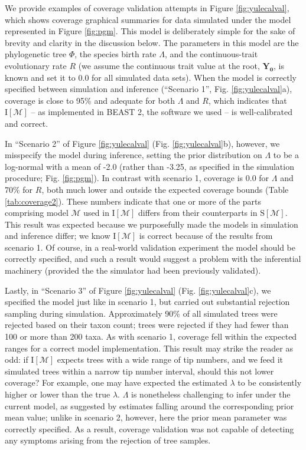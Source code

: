 \documentclass[oneside]{article}
\begin{document}
We provide examples of coverage validation attempts in Figure \ref{fig:yulecalval}, which shows coverage graphical summaries for data simulated under the model represented in Figure \ref{fig:pgm}.
This model is deliberately simple for the sake of brevity and clarity in the discussion below.
The parameters in this model are the phylogenetic tree $\Phi$, the species birth rate $\Lambda$, and the continuous-trait evolutionary rate $R$ (we assume the continuous trait value at the root, $\boldsymbol{Y_0}$, is known and set it to $\boldsymbol{0.0}$ for all simulated data sets).
When the model is correctly specified between simulation and inference (``Scenario 1'', Fig. \ref{fig:yulecalval}a), coverage is close to 95\% and adequate for both $\Lambda$ and $R$, which indicates that $\text{I}[\mathcal{M}]$ -- as implemented in BEAST 2, the software we used -- is well-calibrated and correct.

In ``Scenario 2'' of Figure \ref{fig:yulecalval} (Fig. \ref{fig:yulecalval}b), however, we misspecify the model during inference, setting the prior distribution on $\Lambda$ to be a log-normal with a mean of -2.0 (rather than -3.25, as specified in the simulation procedure; Fig. \ref{fig:pgm}).
In contrast with scenario 1, coverage is 0.0 for $\Lambda$ and 70\% for $R$, both much lower and outside the expected coverage bounds (Table \ref{tab:coverage2}).
These numbers indicate that one or more of the parts comprising model $\mathcal{M}$ used in $\text{I}[\mathcal{M}]$ differs from their counterparts in $\text{S}[\mathcal{M}]$.
This result was expected because we purposefully made the models in simulation and inference differ; we know $\text{I}[\mathcal{M}]$ is correct because of the results from scenario 1.
Of course, in a real-world validation experiment the model should be correctly specified, and such a result would suggest a problem with the inferential machinery (provided the the simulator had been previously validated).

Lastly, in ``Scenario 3'' of Figure \ref{fig:yulecalval} (Fig. \ref{fig:yulecalval}c), we specified the model just like in scenario 1, but carried out substantial rejection sampling during simulation.
Approximately 90\% of all simulated trees were rejected based on their taxon count; trees were rejected if they had fewer than 100 or more than 200 taxa.
As with scenario 1, coverage fell within the expected ranges for a correct model implementation.
This result may strike the reader as odd: if $\text{I}[\mathcal{M}]$ expects trees with a wide range of tip numbers, and we feed it simulated trees within a narrow tip number interval, should this not lower coverage?
For example, one may have expected the estimated $\lambda$ to be consistently higher or lower than the true $\lambda$.
$\Lambda$ is nonetheless challenging to infer under the current model, as suggested by estimates falling around the corresponding prior mean value; unlike in scenario 2, however, here the prior mean parameter was correctly specified.
As a result, coverage validation was not capable of detecting any symptoms arising from the rejection of tree samples.
\end{document}
